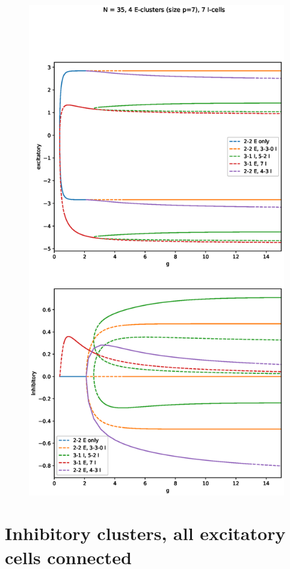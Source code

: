 \documentclass[11pt,reqno]{amsart}
\begin{document}
\begin{figure}[H]
\centering
\includegraphics[width=14cm]{images/bifdiagc4p7i7.eps}
\end{figure}

\section{Inhibitory clusters, all excitatory cells connected}
\end{document}
